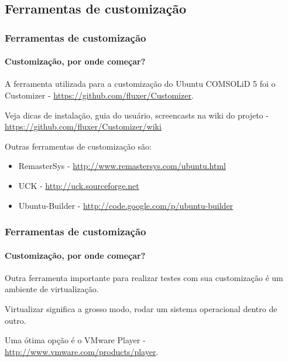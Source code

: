 \subsection{Ferramentas de customização}

\begin{frame}


\end{frame}

\begin{frame}\frametitle{Ferramentas de customização}\framesubtitle{Customização, por onde começar?}

A ferramenta utilizada para a customização do Ubuntu COMSOLiD 5 foi o Customizer -
\url{https://github.com/fluxer/Customizer}.

\medskip

Veja dicas de instalação, guia do usuário, screencasts na wiki do projeto -
\url{https://github.com/fluxer/Customizer/wiki}

\medskip

Outras ferramentas de customização são:

\begin{itemize}
	\item RemasterSys - \url{http://www.remastersys.com/ubuntu.html}
	\item UCK - \url{http://uck.sourceforge.net}
	\item Ubuntu-Builder - \url{http://code.google.com/p/ubuntu-builder}
\end{itemize}

\end{frame}


\begin{frame}\frametitle{Ferramentas de customização}\framesubtitle{Customização, por onde começar?}

Outra ferramenta importante para realizar testes com sua customização é um ambiente de virtualização.

\medskip

Virtualizar significa a grosso modo, rodar um sistema operacional dentro de outro.

\medskip

Uma ótima opção é o VMware Player - \url{http://www.vmware.com/products/player}.

\end{frame}

